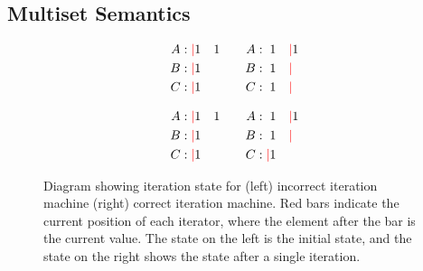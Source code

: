 \documentclass[acmsmall,screen,nonacm]{acmart}\settopmatter{printfolios=true,printccs=false,printacmref=false}
\begin{document}
\subsection{Multiset Semantics}\label{sec:multiset}
\begin{figure}
    \begin{minipage}[t]{0.45\textwidth}\footnotesize
        \setlength{\abovedisplayskip}{0pt}
        \setlength{\belowdisplayskip}{0pt}
        \setlength{\abovedisplayshortskip}{0pt}
        \setlength{\belowdisplayshortskip}{0pt}
        \begin{align*}
            A&: \textcolor{red}{|}1          \quad 1 &\quad A&: \hphantom{|}1          \quad \textcolor{red}{|}1 \\
            B&: \textcolor{red}{|}1\hphantom{\quad 1}&\quad B&: \hphantom{|}1\hphantom{\quad}\textcolor{red}{|}\hphantom{1} \\
            C&: \textcolor{red}{|}1\hphantom{\quad 1}&\quad C&: \hphantom{|}1\hphantom{\quad}\textcolor{red}{|}\hphantom{1}
        \end{align*}
    \end{minipage}
    \hfill\vline\hfill
    \begin{minipage}[t]{0.45\textwidth}\footnotesize
        \setlength{\abovedisplayskip}{0pt}
        \setlength{\belowdisplayskip}{0pt}
        \setlength{\abovedisplayshortskip}{0pt}
        \setlength{\belowdisplayshortskip}{0pt}
        \begin{align*}\footnotesize
            A&: \textcolor{red}{|}1          \quad 1 &\quad A&: \hphantom{|}1          \quad \textcolor{red}{|}1 \\
            B&: \textcolor{red}{|}1\hphantom{\quad 1}&\quad B&: \hphantom{|}1\hphantom{\quad}\textcolor{red}{|}\hphantom{1} \\
            C&: \textcolor{red}{|}1\hphantom{\quad 1}&\quad C&: \textcolor{red}{|}1\hphantom{\quad}\hphantom{|}\hphantom{1}
        \end{align*}
    \end{minipage}
    \caption{Diagram showing iteration state for (left) incorrect iteration machine (right) correct iteration machine. Red bars indicate the current position of each iterator, where the element after the bar is the current value. The state on the left is the initial state, and the state on the right shows the state after a single iteration.}
    \label{fig:multiset-iterators}
\end{figure}
\end{document}
